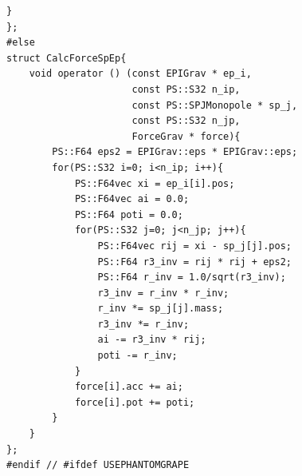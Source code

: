 \begin{lstlisting}[caption=重力$N$体計算]
    }
};
#else
struct CalcForceSpEp{
    void operator () (const EPIGrav * ep_i,
                      const PS::S32 n_ip,
                      const PS::SPJMonopole * sp_j,
                      const PS::S32 n_jp,
                      ForceGrav * force){
        PS::F64 eps2 = EPIGrav::eps * EPIGrav::eps;
        for(PS::S32 i=0; i<n_ip; i++){
            PS::F64vec xi = ep_i[i].pos;
            PS::F64vec ai = 0.0;
            PS::F64 poti = 0.0;
            for(PS::S32 j=0; j<n_jp; j++){
                PS::F64vec rij = xi - sp_j[j].pos;
                PS::F64 r3_inv = rij * rij + eps2;
                PS::F64 r_inv = 1.0/sqrt(r3_inv);
                r3_inv = r_inv * r_inv;
                r_inv *= sp_j[j].mass;
                r3_inv *= r_inv;
                ai -= r3_inv * rij;
                poti -= r_inv;
            }
            force[i].acc += ai;
            force[i].pot += poti;
        }
    }
};
#endif // #ifdef USEPHANTOMGRAPE


\end{lstlisting}

